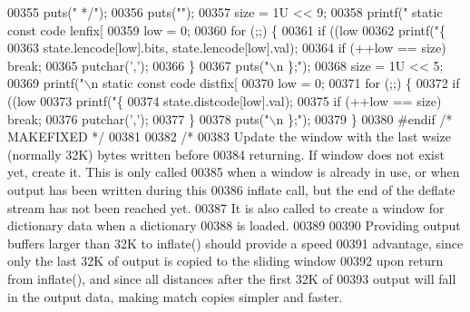 \begin{DoxyCode}
00355     puts(\textcolor{stringliteral}{"     */"});
00356     puts(\textcolor{stringliteral}{""});
00357     size = 1U << 9;
00358     printf(\textcolor{stringliteral}{"    static const code lenfix[%
00359     low = 0;
00360     \textcolor{keywordflow}{for} (;;) \{
00361         \textcolor{keywordflow}{if} ((low %
00362         printf(\textcolor{stringliteral}{"\{%
00363                state.lencode[low].bits, state.lencode[low].val);
00364         \textcolor{keywordflow}{if} (++low == size) \textcolor{keywordflow}{break};
00365         putchar(\textcolor{charliteral}{','});
00366     \}
00367     puts(\textcolor{stringliteral}{"\(\backslash\)n    \};"});
00368     size = 1U << 5;
00369     printf(\textcolor{stringliteral}{"\(\backslash\)n    static const code distfix[%
00370     low = 0;
00371     \textcolor{keywordflow}{for} (;;) \{
00372         \textcolor{keywordflow}{if} ((low %
00373         printf(\textcolor{stringliteral}{"\{%
00374                state.distcode[low].val);
00375         \textcolor{keywordflow}{if} (++low == size) \textcolor{keywordflow}{break};
00376         putchar(\textcolor{charliteral}{','});
00377     \}
00378     puts(\textcolor{stringliteral}{"\(\backslash\)n    \};"});
00379 \}
00380 \textcolor{preprocessor}{#endif }\textcolor{comment}{/* MAKEFIXED */}\textcolor{preprocessor}{}
00381 
00382 \textcolor{comment}{/*}
00383 \textcolor{comment}{   Update the window with the last wsize (normally 32K) bytes written before}
00384 \textcolor{comment}{   returning.  If window does not exist yet, create it.  This is only called}
00385 \textcolor{comment}{   when a window is already in use, or when output has been written during this}
00386 \textcolor{comment}{   inflate call, but the end of the deflate stream has not been reached yet.}
00387 \textcolor{comment}{   It is also called to create a window for dictionary data when a dictionary}
00388 \textcolor{comment}{   is loaded.}
00389 \textcolor{comment}{}
00390 \textcolor{comment}{   Providing output buffers larger than 32K to inflate() should provide a speed}
00391 \textcolor{comment}{   advantage, since only the last 32K of output is copied to the sliding window}
00392 \textcolor{comment}{   upon return from inflate(), and since all distances after the first 32K of}
00393 \textcolor{comment}{   output will fall in the output data, making match copies simpler and faster.}
}}}}
\end{DoxyCode}
